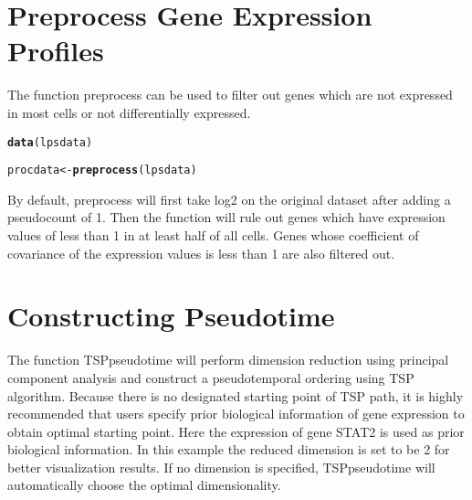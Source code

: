 \documentclass[10pt,oneside]{article}\usepackage[]{graphicx}\usepackage[]{color}
\makeatletter
\newcommand{\hlstd}[1]{\textcolor[rgb]{0.345,0.345,0.345}{#1}}%
\newcommand{\hlkwb}[1]{\textcolor[rgb]{0.69,0.353,0.396}{#1}}%
\newcommand{\hlkwd}[1]{\textcolor[rgb]{0.737,0.353,0.396}{\textbf{#1}}}%
\newenvironment{kframe}{%
 \def\at@end@of@kframe{}%
 \ifinner\ifhmode%
  \def\at@end@of@kframe{\end{minipage}}%
  \begin{minipage}{\columnwidth}%
 \fi\fi%
 \def\FrameCommand##1{\hskip\@totalleftmargin \hskip-\fboxsep
 \colorbox{shadecolor}{##1}\hskip-\fboxsep
     \hskip-\linewidth \hskip-\@totalleftmargin \hskip\columnwidth}%
 \MakeFramed {\advance\hsize-\width
   \@totalleftmargin\z@ \linewidth\hsize
   \@setminipage}}%
 {\par\unskip\endMakeFramed%
 \at@end@of@kframe}
\newenvironment{knitrout}{}{} %
\makeatother
\begin{document}
\section{Preprocess Gene Expression Profiles}

The function preprocess can be used to filter out genes which are not expressed in most cells or not differentially expressed. 

\begin{knitrout}
\color{fgcolor}\begin{kframe}
\begin{alltt}
\hlkwd{data}\hlstd{(lpsdata)}
\end{alltt}


{\ttfamily\noindent\color{warningcolor}{\#\# Warning: data set 'lpsdata' not found}}\begin{alltt}
\hlstd{procdata} \hlkwb{<-} \hlkwd{preprocess}\hlstd{(lpsdata)}
\end{alltt}


{\ttfamily\noindent\bfseries{}}\end{kframe}
\end{knitrout}

By default, preprocess will first take log2 on the original dataset after adding a pseudocount of 1. Then the function will rule out genes which have expression values of less than 1 in at least half of all cells. Genes whose coefficient of covariance of the expression values is less than 1 are also filtered out.

\section{Constructing Pseudotime}

The function TSPpseudotime will perform dimension reduction using principal component analysis and construct a pseudotemporal ordering using TSP algorithm. Because there is no designated starting point of TSP path, it is highly recommended that users specify prior biological information of gene expression to obtain optimal starting point. Here the expression of gene STAT2 is used as prior biological information. In this example the reduced dimension is set to be 2 for better visualization results. If no dimension is specified, TSPpseudotime will automatically choose the optimal dimensionality.
\end{document}
